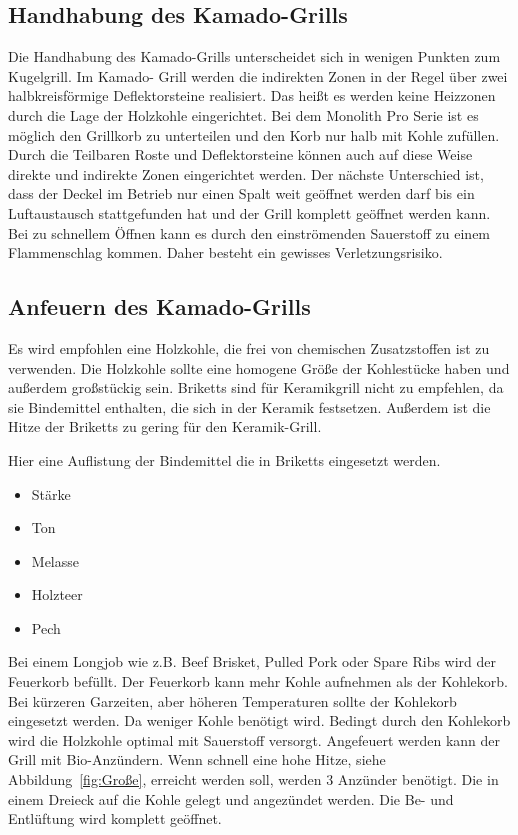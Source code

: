 \subsection{Handhabung des Kamado-Grills}

	Die Handhabung des Kamado-Grills unterscheidet sich in wenigen Punkten 
	zum Kugelgrill. Im Kamado-
	Grill werden die indirekten Zonen in der Regel über zwei halbkreisförmige 
	Deflektorsteine realisiert. 
	Das heißt es werden keine Heizzonen durch die Lage der Holzkohle 
	eingerichtet. Bei dem Monolith Pro Serie ist 
	es möglich den Grillkorb zu unterteilen und den Korb nur halb mit Kohle 
	zufüllen. Durch die Teilbaren 
	Roste und Deflektorsteine können auch auf diese Weise direkte und indirekte 
	Zonen eingerichtet 
	werden.
	Der nächste Unterschied ist, dass der Deckel im Betrieb nur einen Spalt weit 
	geöffnet werden darf bis 
	ein Luftaustausch stattgefunden hat und der Grill komplett geöffnet werden 
	kann. Bei zu schnellem Öffnen kann es durch den einströmenden 
	Sauerstoff zu einem Flammenschlag kommen. Daher besteht ein gewisses 
	Verletzungsrisiko.

\subsection{Anfeuern des Kamado-Grills}

	Es wird empfohlen eine Holzkohle, die frei von chemischen Zusatzstoffen ist zu 
	verwenden. Die Holzkohle
	sollte eine homogene Größe der Kohlestücke haben und außerdem großstückig 
	sein. Briketts sind für Keramikgrill
	nicht zu empfehlen, da sie Bindemittel enthalten, die sich in der Keramik 
	festsetzen. Außerdem ist die
	Hitze der Briketts zu gering für den Keramik-Grill.
	
	Hier eine Auflistung der Bindemittel die in Briketts eingesetzt werden.

	\begin{itemize}[noitemsep]
		\item Stärke
		\item Ton
		\item Melasse
		\item Holzteer
		\item Pech
	\end{itemize}
 
  
	Bei einem Longjob wie z.B. Beef Brisket, Pulled Pork oder Spare Ribs wird der 
	Feuerkorb befüllt. Der 
	Feuerkorb kann mehr Kohle aufnehmen als der  Kohlekorb. Bei kürzeren 
	Garzeiten, aber höheren 
	Temperaturen sollte der Kohlekorb eingesetzt werden. Da weniger Kohle 
	benötigt wird. Bedingt durch 
	den Kohlekorb wird die Holzkohle optimal mit Sauerstoff versorgt.
	Angefeuert werden kann der Grill mit Bio-Anzündern. Wenn schnell eine hohe 
	Hitze, siehe 
	Abbildung~\vref{fig:Große}, erreicht werden soll, werden 3 Anzünder benötigt. 
	Die in einem Dreieck auf 
	die Kohle gelegt und angezündet werden. Die Be- und Entlüftung wird komplett 
	geöffnet.
	
